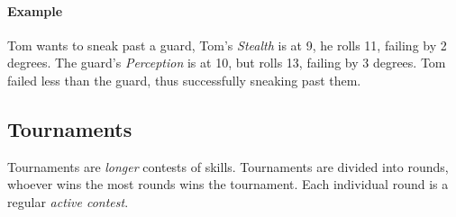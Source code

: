 \paragraph{Example} Tom wants to sneak past a guard, Tom's \textit{Stealth} is at 9, he rolls 11, failing by 2 degrees. 
The guard's \textit{Perception} is at 10, but rolls 13, failing by 3 degrees. 
Tom failed less than the guard, thus successfully sneaking past them.

\subsection{Tournaments}
Tournaments are \textit{longer} contests of skills.
Tournaments are divided into rounds, whoever wins the most rounds wins the tournament.
Each individual round is a regular \textit{active contest}.
